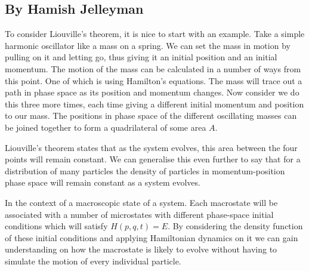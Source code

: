 \subsection{By Hamish Jelleyman}
To consider Liouville’s theorem, it is nice to start with an example. Take a simple harmonic oscillator like a mass on a spring. We can set the mass in motion by pulling on it and letting go, thus giving it an initial position and an initial momentum. The motion of the mass can be calculated in a number of ways from this point. One of which is using Hamilton’s equations. The mass will trace out a path in phase space as its position and momentum changes. Now consider we do this three more times, each time giving a different initial momentum and position to our mass. The positions in phase space of the different oscillating masses can be joined together to form a quadrilateral of some area $A$.\medskip 


Liouville’s theorem states that as the system evolves, this area between the four points will remain constant. We can generalise this even further to say that for a distribution of many particles the density of particles in momentum-position phase space will remain constant as a system evolves. \medskip 


In the context of a macroscopic state of a system. Each macrostate will be associated with a number of microstates with different phase-space initial conditions which will satisfy $H(p,q,t)=E$. By considering the density function of these initial conditions and applying Hamiltonian dynamics on it we can gain understanding on how the macrostate is likely to evolve without having to simulate the motion of every individual particle.
